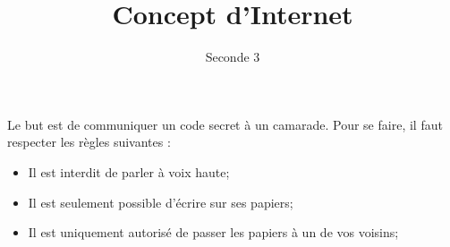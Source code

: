 \documentclass{article}
\title{Concept d'Internet}
\date{}
\author{Seconde 3}
\begin{document}
\maketitle

Le but est de communiquer un code secret à un camarade. Pour se faire, il faut respecter les règles suivantes :
\begin{itemize}
\item Il est interdit de parler à voix haute;
\item Il est seulement possible d'écrire sur ses papiers;
\item Il est uniquement autorisé de passer les papiers à un de vos voisins;
\end{itemize}
\end{document}
